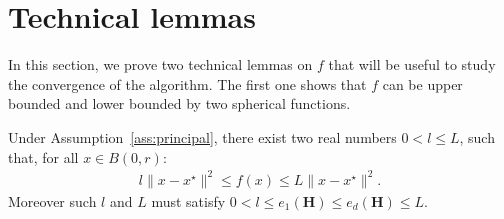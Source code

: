 \section{Technical lemmas}
\label{sec:teclemmas}
In this section, we prove two technical lemmas on $f$ that will be useful to study the convergence of the algorithm. The first one shows that $f$ can be upper bounded and lower bounded by two spherical functions. 
\begin{lemma}
\label{lem:sandwich}
Under Assumption~\ref{ass:principal}, there exist two real numbers $0<l\leq L$, such that, for all $x\in B(0,r)$:
\begin{align}
\label{eq:lip-cond}
   l\lVert x-x^\star\rVert^2 \leq f(x)\leq L\lVert x-x^\star\rVert^2.
\end{align}
Moreover such $l$ and $L$ must satisfy  $0< l\leq e_1(\mathbf{H})\leq e_d(\mathbf{H})\leq L$.
\end{lemma}
